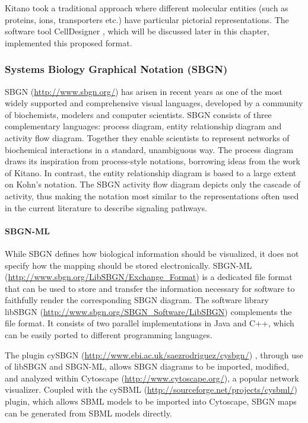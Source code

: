 Kitano \autocite{Kitano2003} took a traditional approach where different
molecular entities (such as proteins, ions, transporters etc.) have
particular pictorial representations. The software tool CellDesigner
\autocite{CellDesigner2003}, which will be discussed later in this
chapter, implemented this proposed format.

\subsubsection{Systems Biology Graphical Notation (SBGN)}

SBGN (\url{http://www.sbgn.org/}) \autocite{le2009systems} has arisen in
recent years as one of the most widely supported and comprehensive
visual languages, developed by a community of biochemists, modelers and
computer scientists. SBGN consists of three complementary languages:
process diagram, entity relationship diagram and activity flow diagram.
Together they enable scientists to represent networks of biochemical
interactions in a standard, unambiguous way. The process diagram draws
its inspiration from process-style notations, borrowing ideas from the
work of Kitano. In contrast, the entity relationship diagram is based to
a large extent on Kohn's notation. The SBGN activity flow diagram
depicts only the cascade of activity, thus making the notation most
similar to the representations often used in the current literature to
describe signaling pathways.

\paragraph{SBGN-ML}

While SBGN defines how biological information should be visualized, it
does not specify how the mapping should be stored electronically.
SBGN-ML (\url{http://www.sbgn.org/LibSBGN/Exchange_Format})
\autocite{le2010report} is a dedicated file format that can be used to
store and transfer the information necessary for software to faithfully
render the corresponding SBGN diagram. The software library libSBGN
(\url{http://www.sbgn.org/SBGN_Software/LibSBGN}) complements the file
format. It consists of two parallel implementations
\autocite{van2012software} in Java and C++, which can be easily ported
to different programming languages.

The plugin cySBGN (\url{http://www.ebi.ac.uk/saezrodriguez/cysbgn/})
\autocite{goncalves2013cysbgn}, through use of libSBGN and SBGN-ML,
allows SBGN diagrams to be imported, modified, and analyzed within
Cytoscape (\url{http://www.cytoscape.org/}), a popular network
visualizer. Coupled with the cySBML
(\url{http://sourceforge.net/projects/cysbml/})
\autocite{konig2012cysbml} plugin, which allows SBML models to be
imported into Cytoscape, SBGN maps can be generated from SBML models
directly.

